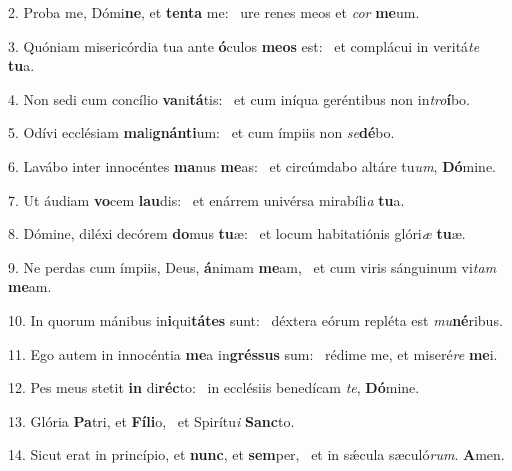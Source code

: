 2. Proba me, Dómi\textbf{ne}, et \textbf{ten}\textbf{ta} me: \ast\  ure renes meos et \textit{cor} \textbf{me}um.\

3. Quóniam misericórdia tua ante \textbf{ó}culos \textbf{me}\textbf{os} est: \ast\  et complácui in veritá\textit{te} \textbf{tu}a.\

4. Non sedi cum concílio \textbf{va}ni\textbf{tá}tis: \ast\  et cum iníqua geréntibus non in\textit{tro}\textbf{í}bo.\

5. Odívi ecclésiam \textbf{ma}li\textbf{gnán}\textbf{ti}um: \ast\  et cum ímpiis non \textit{se}\textbf{dé}bo.\

6. Lavábo inter innocéntes \textbf{ma}nus \textbf{me}as: \ast\  et circúmdabo altáre tu\textit{um}, \textbf{Dó}mine.\

7. Ut áudiam \textbf{vo}cem \textbf{lau}dis: \ast\  et enárrem univérsa mirabíli\textit{a} \textbf{tu}a.\

8. Dómine, diléxi decórem \textbf{do}mus \textbf{tu}æ: \ast\  et locum habitatiónis glóri\textit{æ} \textbf{tu}æ.\

9. Ne perdas cum ímpiis, Deus, \textbf{á}nimam \textbf{me}am, \ast\  et cum viris sánguinum vi\textit{tam} \textbf{me}am.\

10. In quorum mánibus in\textbf{i}qui\textbf{tá}\textbf{tes} sunt: \ast\  déxtera eórum repléta est \textit{mu}\textbf{né}ribus.\

11. Ego autem in innocéntia \textbf{me}a in\textbf{grés}\textbf{sus} sum: \ast\  rédime me, et miseré\textit{re} \textbf{me}i.\

12. Pes meus stetit \textbf{in} di\textbf{réc}to: \ast\  in ecclésiis benedícam \textit{te}, \textbf{Dó}mine.\

13. Glória \textbf{Pa}tri, et \textbf{Fí}\textbf{li}o, \ast\  et Spirítu\textit{i} \textbf{Sanc}to.\

14. Sicut erat in princípio, et \textbf{nunc}, et \textbf{sem}per, \ast\  et in sǽcula sæculó\textit{rum}. \textbf{A}men.\

